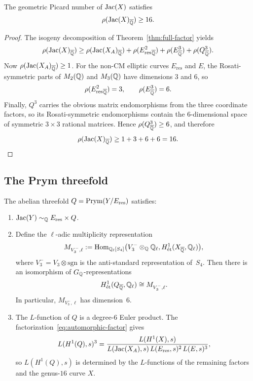 \begin{corollary}\label{cor:picard}
The geometric Picard number of \(\operatorname{Jac}(X)\) satisfies
\[
\rho(\operatorname{Jac}(X)_{\overline{\mathbb{Q}}})\geq 16.
\]
\end{corollary}

\begin{proof}
The isogeny decomposition of Theorem~\ref{thm:full-factor} yields
\[
\rho(\operatorname{Jac}(X)_{\overline{\mathbb{Q}}})\geq \rho(\operatorname{Jac}(X_A)_{\overline{\mathbb{Q}}})+\rho(E_{\mathrm{res}}^2{}_{\overline{\mathbb{Q}}})+\rho(E^3_{\overline{\mathbb{Q}}})+\rho(Q^3_{\overline{\mathbb{Q}}}).
\]
Now \(\rho(\operatorname{Jac}(X_A)_{\overline{\mathbb{Q}}})\geq 1\). For the non-CM elliptic curves \(E_{\mathrm{res}}\) and \(E\), the Rosati-symmetric parts of \(M_2(\mathbb{Q})\) and \(M_3(\mathbb{Q})\) have dimensions \(3\) and \(6\), so
\[
\rho(E_{\mathrm{res}}^2{}_{\overline{\mathbb{Q}}})=3,\qquad \rho(E^3_{\overline{\mathbb{Q}}})=6.
\]
Finally, \(Q^3\) carries the obvious matrix endomorphisms from the three coordinate factors, so its Rosati-symmetric endomorphisms contain the \(6\)-dimensional space of symmetric \(3\times 3\) rational matrices. Hence \(\rho(Q^3_{\overline{\mathbb{Q}}})\geq 6\), and therefore
\[
\rho(\operatorname{Jac}(X)_{\overline{\mathbb{Q}}})\geq 1+3+6+6=16.
\]
\end{proof}

\subsection{The Prym threefold}

\begin{proposition}\label{prop:prym-threefold}
The abelian threefold \(Q=\operatorname{Prym}(Y/E_{\mathrm{res}})\) satisfies:
\begin{enumerate}
\item[(i)] \(\operatorname{Jac}(Y)\sim_{\mathbb{Q}}E_{\mathrm{res}}\times Q\).
\item[(ii)] Define the \(\ell\)-adic multiplicity representation
\[
M_{V_3^-,\ell}:=\operatorname{Hom}_{\mathbb{Q}_\ell[S_4]}
\bigl(V_3^-\otimes_{\mathbb{Q}}\mathbb{Q}_\ell,
H^1_{\mathrm{\acute et}}(X_{\overline{\mathbb{Q}}},\mathbb{Q}_\ell)\bigr),
\]
where \(V_3^-=V_3\otimes\mathrm{sgn}\) is the anti-standard representation of~\(S_4\). Then there is an isomorphism of \(G_{\mathbb{Q}}\)-representations
\[
H^1_{\mathrm{\acute et}}(Q_{\overline{\mathbb{Q}}},\mathbb{Q}_\ell)\cong M_{V_3^-,\ell}.
\]
In particular, \(M_{V_3^-,\ell}\) has dimension~\(6\).
\item[(iii)] The \(L\)-function of \(Q\) is a degree-\(6\) Euler product. The factorization~\eqref{eq:automorphic-factor} gives
\[
L(H^1(Q),s)^3=\frac{L(H^1(X),s)}{L(\operatorname{Jac}(X_A),s)\,L(E_{\mathrm{res}},s)^2\,L(E,s)^3},
\]
so \(L(H^1(Q),s)\) is determined by the \(L\)-functions of the remaining factors and the genus-\(16\) curve \(X\).
\end{enumerate}
\end{proposition}

